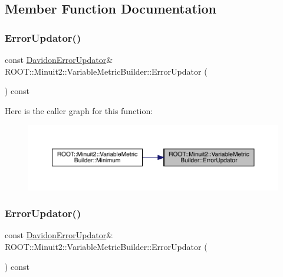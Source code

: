 \subsection{Member Function Documentation}
\mbox{\label{classROOT_1_1Minuit2_1_1VariableMetricBuilder_aa10879d53daedb3e742f35d3c3f3b3d6}} 
\subsubsection{\texorpdfstring{ErrorUpdator()}{ErrorUpdator()}\hspace{0.1cm}{\footnotesize\ttfamily [1/3]}}
{\footnotesize\ttfamily const \mbox{\hyperlink{classROOT_1_1Minuit2_1_1DavidonErrorUpdator}{Davidon\+Error\+Updator}}\& R\+O\+O\+T\+::\+Minuit2\+::\+Variable\+Metric\+Builder\+::\+Error\+Updator (\begin{DoxyParamCaption}{ }\end{DoxyParamCaption}) const\hspace{0.3cm}{\ttfamily [inline]}}

Here is the caller graph for this function\+:
\nopagebreak
\begin{figure}[H]
\begin{center}
\leavevmode
\includegraphics[width=350pt]{d5/d52/classROOT_1_1Minuit2_1_1VariableMetricBuilder_aa10879d53daedb3e742f35d3c3f3b3d6_icgraph}
\end{center}
\end{figure}
\mbox{\label{classROOT_1_1Minuit2_1_1VariableMetricBuilder_aa10879d53daedb3e742f35d3c3f3b3d6}} 
\subsubsection{\texorpdfstring{ErrorUpdator()}{ErrorUpdator()}\hspace{0.1cm}{\footnotesize\ttfamily [2/3]}}
{\footnotesize\ttfamily const \mbox{\hyperlink{classROOT_1_1Minuit2_1_1DavidonErrorUpdator}{Davidon\+Error\+Updator}}\& R\+O\+O\+T\+::\+Minuit2\+::\+Variable\+Metric\+Builder\+::\+Error\+Updator (\begin{DoxyParamCaption}{ }\end{DoxyParamCaption}) const\hspace{0.3cm}{\ttfamily [inline]}}

